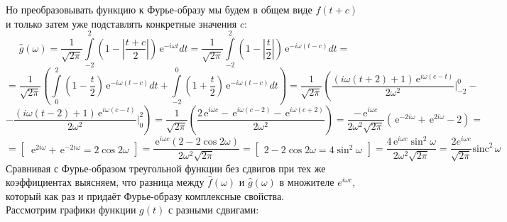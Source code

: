 \documentclass[a4paper]{article}
\newcommand{\at}{\biggr\rvert}
\newcommand{\e}{\,\text{e}}
\let\oldint\int
\def\int{\oldint\limits}
\begin{document}
Но преобразовывать функцию к Фурье-образу мы будем в общем виде $f(t + c)$ и только затем уже подставлять конкретные значения $c$:
$$\hat{g}(\omega)=\frac{1}{\sqrt{2\pi}}\int_{-2}^{2}\left( 1 - \left| \frac{t + c}{2} \right| \right)\e^{-i\omega t}dt=\frac{1}{\sqrt{2\pi}}\int_{-2}^{2}\left( 1 - \left| \frac{t}{2} \right| \right)\e^{-i\omega (t - c)}dt = $$
$$ = \frac{1}{\sqrt{2\pi}}\left( \int_{0}^{2}\left( 1 - \frac{t}{2} \right)\e^{-i\omega (t - c)}dt + \int_{-2}^{0}\left( 1 + \frac{t}{2} \right)\e^{-i\omega (t - c)}dt \right) = \frac{1}{\sqrt{2\pi}}\left( \frac{(i\omega (t + 2) + 1)\e^{i\omega(c-t)}}{2\omega^2}\at^0_{-2} -\right.$$
$$\left. - \frac{(i\omega (t - 2) + 1)\e^{i\omega(c-t)}}{2\omega^2}\at^2_0 \right) = \frac{1}{\sqrt{2\pi}}\left( \frac{2\e^{i\omega c} - \e^{i\omega(c-2)} - \e^{i\omega(c+2)}}{2\omega^2} \right) = \frac{-\e^{i\omega c}}{2\omega^2\sqrt{2\pi}}\left( \e^{-2i\omega} + \e^{2i\omega} - 2 \right) = $$
$$ = \begin{bmatrix}
    \e^{2i\omega} + \e^{-2i\omega} = 2\cos{2\omega}
\end{bmatrix} = \frac{\e^{i\omega c}(2 - 2\cos2\omega)}{2\omega^2\sqrt{2\pi}} = \begin{bmatrix}
    2 - 2\cos{2\omega} = 4\sin^2\omega
\end{bmatrix} = \frac{4\e^{i\omega c}\sin^2\omega}{2\omega^2\sqrt{2\pi}} = \frac{2e^{i\omega c}}{\sqrt{2\pi}}\text{sinc}^2\,\omega$$
Сравнивая с Фурье-образом треугольной функции без сдвигов при тех же коэффициентах выясняем, что разница между $\hat{f}(\omega)$ и $\hat{g}(\omega)$ в множителе $e^{i\omega c}$, который как раз и придаёт Фурье-образу комплексные свойства.\\[0.5em]
Рассмотрим графики функции $g(t)$ с разными сдвигами:
\end{document}
